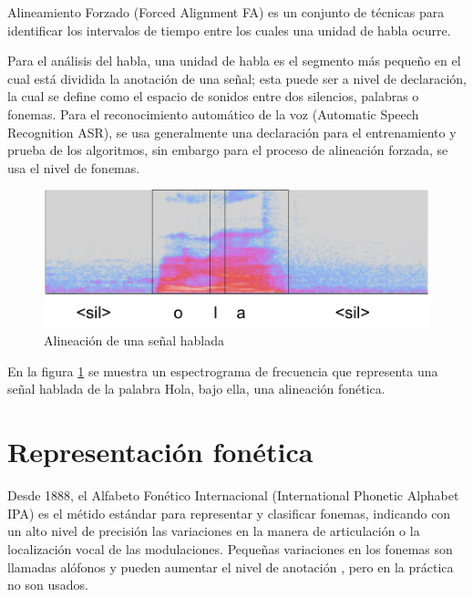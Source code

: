 Alineamiento Forzado (Forced Alignment FA) es un conjunto de técnicas para identificar los intervalos de tiempo entre los cuales una unidad de habla ocurre.

Para el análisis del habla, una unidad de habla es el segmento más pequeño en el cual está dividida la anotación de una señal; esta puede ser a nivel de declaración, la cual se define como el espacio de sonidos entre dos silencios, palabras o fonemas. Para el reconocimiento automático de la voz (Automatic Speech Recognition ASR), se usa generalmente una declaración para el entrenamiento y prueba de los algoritmos, sin embargo para el proceso de alineación forzada, se usa el nivel de fonemas.

\begin{figure}[H]

\centering
\caption{Alineación de una señal hablada}
\label{img:alignment}
\includegraphics[scale=0.50]{imagenes/alignment.png}
\end{figure}

En la figura \ref{img:alignment} se muestra un espectrograma de frecuencia que representa una señal hablada de la palabra Hola, bajo ella, una alineación fonética.

\section{Representación fonética}

Desde 1888, el Alfabeto Fonético Internacional (International Phonetic Alphabet IPA) es el métido estándar para representar y clasificar fonemas, indicando con un alto nivel de precisión las variaciones en la manera de articulación o la localización vocal de las modulaciones. Pequeñas variaciones en los fonemas son llamadas alófonos y pueden aumentar el nivel de anotación  \cite{IPAAlphabet}, pero en la práctica no son usados.

